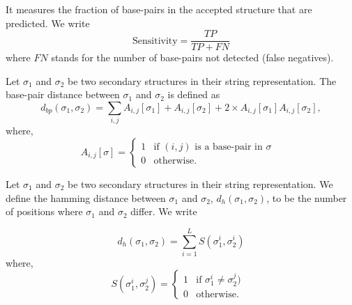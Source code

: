 \begin{mydef}[Sensitivity]
	\label{def:sensitivity}
	It measures the fraction of base-pairs in the accepted structure that are predicted. We write
	\begin{equation}
	\text{Sensitivity} = \frac{TP}{TP+FN}
	\end{equation}
	where $FN$ stands for the number of base-pairs not detected (false
	negatives).
\end{mydef}
\begin{mydef}
	\label{def:bp_distance}
	Let $\sigma_1$ and $\sigma_2$ be two secondary structures in their string representation.  The base-pair distance between $\sigma_1$ and $\sigma_2$ is defined as
	\begin{equation}
	d_{bp}(\sigma_1, \sigma_2 )= \sum_{i,j} A_{i,j}[\sigma_1] + A_{i,j}[\sigma_2] + 2\times A_{i,j}[\sigma_1] A_{i,j}[\sigma_2],
	\end{equation}
	where, 
	$$
	A_{i,j}[\sigma] =
	\begin{cases}
	1 & \text{if $(i,j)$ is a base-pair in $\sigma$ } \\
	0 & \text{otherwise}.
	\end{cases}
	$$
\end{mydef}

\begin{mydef}
	\label{def:hamming_distance}
	Let $\sigma_1$ and $\sigma_2$ be two secondary structures in their string representation. We define the hamming distance between $\sigma_1$ and $\sigma_2$, $d_h(\sigma_1, \sigma_2)$, to be the number of positions where $\sigma_1$ and $\sigma_2$ differ.  We write 
	
	\begin{equation}
	\label{eq:hamming}
	d_h(\sigma_1, \sigma_2) = \sum_{i=1}^{L}{S(\sigma_1^i, \sigma_2^i)}
	\end{equation}
	where, 
	$$
	S(\sigma_1^i, \sigma_2^j) =
	\begin{cases}
	1 & \text{if $\sigma_1^i \neq \sigma_2^j)$ } \\
	0 & \text{otherwise}.
	\end{cases}
	$$
\end{mydef}

